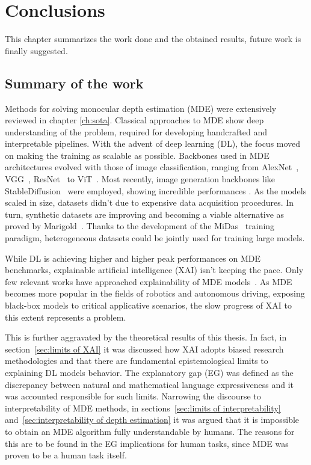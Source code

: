 \chapter{Conclusions}
\label{ch:conc}

This chapter summarizes the work done and the obtained results, future work is finally suggested.

\section{Summary of the work}
Methods for solving monocular depth estimation (MDE) were extensively reviewed in chapter \ref{ch:sota}.
Classical approaches to MDE show deep understanding of the problem, required for developing handcrafted and interpretable pipelines.
With the advent of deep learning (DL), the focus moved on making the training as scalable as possible.
Backbones used in MDE architectures evolved with those of image classification, ranging from AlexNet~\cite{AlexNet}, VGG~\cite{VGG}, ResNet~\cite{ResNet} to ViT~\cite{ViT}.
Most recently, image generation backbones like StableDiffusion~\cite{StableDiffusionV2} were employed, showing incredible performances \cite{Marigold}.
As the models scaled in size, datasets didn't due to expensive data acquisition procedures.
In turn, synthetic datasets \cite{VirtualKITTI2, Hypersim} are improving and becoming a viable alternative as proved by Marigold~\cite{Marigold}.
Thanks to the development of the MiDas~\cite{MiDas} training paradigm, heterogeneous datasets could be jointly used for training large models.

While DL is achieving higher and higher peak performances on MDE benchmarks, explainable artificial intelligence (XAI) isn't keeping the pace.
Only few relevant works have approached explainability of MDE models~\cite{Hu, Dijk, towards_interpretable}.
As MDE becomes more popular in the fields of robotics and autonomous driving, exposing black-box models to critical applicative scenarios, the slow progress of XAI to this extent represents a problem.

This is further aggravated by the theoretical results of this thesis.
In fact, in section~\ref{sec:limits of XAI} it was discussed how XAI adopts biased research methodologies and that there are fundamental epistemological limits to explaining DL models behavior.
The explanatory gap (EG) was defined as the discrepancy between natural and mathematical language expressiveness and it was accounted responsible for such limits.
Narrowing the discourse to interpretability of MDE methods, in sections~\ref{sec:limits of interpretability} and~\ref{sec:interpretability of depth estimation} it was argued that it is impossible to obtain an MDE algorithm fully understandable by humans.
The reasons for this are to be found in the EG implications for human tasks, since MDE was proven to be a human task itself.

